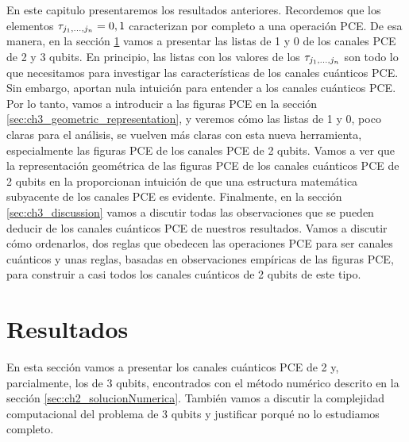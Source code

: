 En este capitulo presentaremos los resultados anteriores.
Recordemos que los elementos $\tau_{j_1,\ldots ,j_n}=0,1$ caracterizan por completo a una 
operación PCE. De esa manera, en la sección \ref{sec:ch3_resultados} vamos a presentar
las listas de 1 y 0 de los canales PCE de 2 y 3 qubits. En principio, las 
listas con los valores de los $\tau_{j_1,\ldots ,j_n}$ son todo lo que necesitamos para investigar las características de 
los canales cuánticos PCE. Sin embargo, aportan nula intuición para entender
a los canales cuánticos PCE. Por lo tanto,
vamos a introducir a las figuras PCE en la sección 
\ref{sec:ch3_geometric_representation}, y veremos cómo las listas de 1 y 0,
poco claras para el análisis, se vuelven más claras con esta 
nueva herramienta, especialmente las figuras PCE de los canales 
PCE de 2 qubits.
Vamos a ver que la representación geométrica de las figuras PCE de 
los canales cuánticos PCE de 2 qubits en la
 proporcionan intuición de 
que una estructura matemática subyacente de los canales PCE es evidente.
Finalmente, en la sección \ref{sec:ch3_discussion} vamos a discutir 
todas las observaciones que se pueden deducir de los canales cuánticos PCE
de nuestros resultados. Vamos a discutir cómo ordenarlos, dos reglas 
que obedecen las operaciones PCE para ser canales cuánticos y unas 
reglas, basadas en observaciones empíricas de las figuras PCE, para 
construir a casi todos los canales cuánticos de 2 qubits de este tipo. 

\section{Resultados}\label{sec:ch3_resultados} %
En esta sección vamos a presentar los canales cuánticos PCE de 2 y,
parcialmente, los de 3 qubits, 
encontrados con el método numérico descrito en la sección 
\ref{sec:ch2_solucionNumerica}. También vamos a discutir la complejidad 
computacional del problema de 3 qubits y justificar porqué no lo estudiamos completo.

